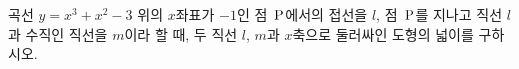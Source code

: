 곡선 $y=x^3+x^2-3$ 위의 $x$좌표가 $-1$인 점~$\mathrm{P}$에서의 접선을 $l$, 점~$\mathrm{P}$를 지나고 직선 $l$과 수직인 직선을 $m$이라 할 때, 두 직선 $l$, $m$과 $x$축으로 둘러싸인 도형의 넓이를 구하시오.
